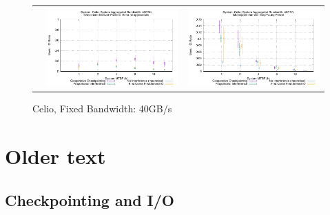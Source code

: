 \documentclass[conference]{IEEEtran}
\begin{document}
\begin{figure}[t]
\begin{tabular}{C{.02\linewidth}C{.49\linewidth}C{.49\linewidth}}
 & \includegraphics[width=\linewidth]{sim/figures/40gbs-1hckpt-io-celio.pdf} & \includegraphics[width=\linewidth]{sim/figures/40gbs-dalyckpt-io-celio.pdf}
\end{tabular}
\caption{Celio, Fixed Bandwidth: 40GB/s}
\end{figure}

\clearpage


\section{Older text}



\subsection{Checkpointing and I/O}
\end{document}
